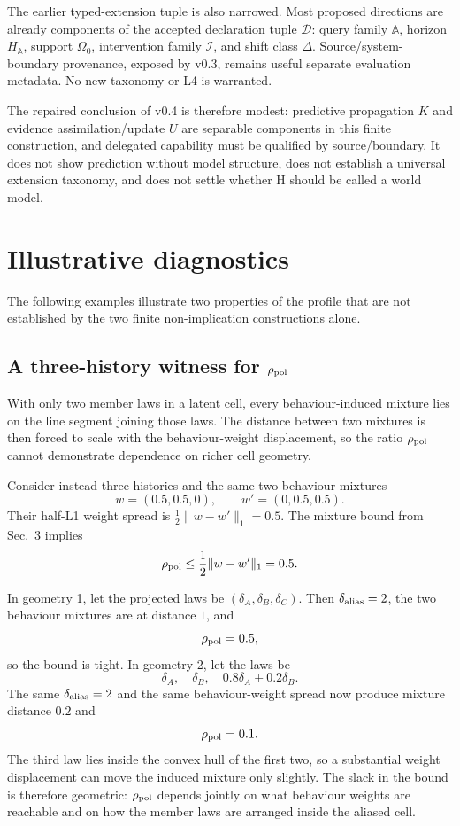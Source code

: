 \documentclass[10pt]{article}
\begin{document}
The earlier typed-extension tuple is also narrowed. Most proposed directions are already components of the accepted declaration tuple $\mathcal D$: query family $\mathbb A$, horizon $H_{\mathbb A}$, support $\Omega_0$, intervention family $\mathcal I$, and shift class $\Delta$. Source/system-boundary provenance, exposed by v0.3, remains useful separate evaluation metadata. No new taxonomy or L4 is warranted.

The repaired conclusion of v0.4 is therefore modest: predictive propagation $K$ and evidence assimilation/update $U$ are separable components in this finite construction, and delegated capability must be qualified by source/boundary. It does not show prediction without model structure, does not establish a universal extension taxonomy, and does not settle whether H should be called a world model.

\section{Illustrative diagnostics}

The following examples illustrate two properties of the profile that are not established by the two finite non-implication constructions alone.

\subsection{A three-history witness for $\rho_{\rm pol}$}
\label{sec:rho3}

With only two member laws in a latent cell, every behaviour-induced mixture lies on the line segment joining those laws. The distance between two mixtures is then forced to scale with the behaviour-weight displacement, so the ratio $\rho_{\rm pol}$ cannot demonstrate dependence on richer cell geometry.

Consider instead three histories and the same two behaviour mixtures
\[
w=(0.5,0.5,0),
\qquad
w'=(0,0.5,0.5).
\]
Their half-L1 weight spread is $\tfrac12\lVert w-w'\rVert_1=0.5$. The mixture bound from Sec.~3 implies
\[
\rho_{\rm pol}\le \frac12\lVert w-w'\rVert_1=0.5.
\]

In geometry 1, let the projected laws be $(\delta_A,\delta_B,\delta_C)$. Then $\delta_{\rm alias}=2$, the two behaviour mixtures are at distance $1$, and
\[
\rho_{\rm pol}=0.5,
\]
so the bound is tight. In geometry 2, let the laws be
\[
\delta_A,\quad \delta_B,\quad 0.8\delta_A+0.2\delta_B.
\]
The same $\delta_{\rm alias}=2$ and the same behaviour-weight spread now produce mixture distance $0.2$ and
\[
\rho_{\rm pol}=0.1.
\]
The third law lies inside the convex hull of the first two, so a substantial weight displacement can move the induced mixture only slightly. The slack in the bound is therefore geometric: $\rho_{\rm pol}$ depends jointly on what behaviour weights are reachable and on how the member laws are arranged inside the aliased cell.
\end{document}

